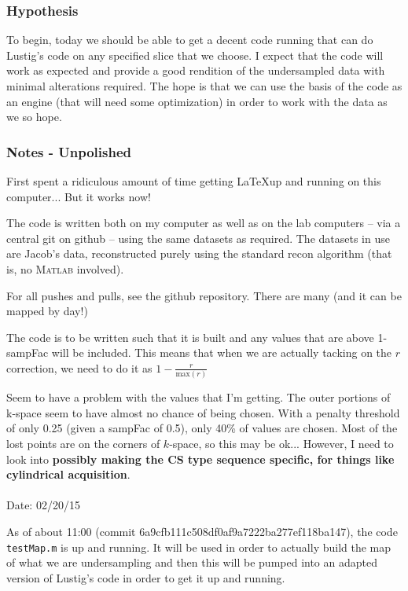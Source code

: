 \documentclass[11 pt]{article}
\newcommand{\matlab}{\textsc{Matlab }}
\begin{document}
\subsubsection{Hypothesis}
To begin, today we should be able to get a decent code running that can do Lustig's code on any specified slice that we choose. I expect that the code will work as expected and provide a good rendition of the undersampled data with minimal alterations required. The hope is that we can use the basis of the code as an engine (that will need some optimization) in order to work with the data as we so hope.


    \subsubsection{Notes - Unpolished}
    First spent a ridiculous amount of time getting \LaTeX up and running on this computer... But it works now! 

    The code is written both on my computer as well as on the lab computers -- via a central git on github -- using the same datasets as required. The datasets in use are Jacob's data, reconstructed purely using the standard recon algorithm (that is, no \matlab involved).

    For all pushes and pulls, see the github repository. There are many (and it can be mapped by day!)

    The code is to be written such that it is built and any values that are above 1-sampFac will be included. This means that when we are actually tacking on the $r$ correction, we need to do it as $1-\frac{r}{\text{max}(r)}$

    Seem to have a problem with the values that I'm getting. The outer portions of k-space seem to have almost no chance of being chosen. With a penalty threshold of only 0.25 (given a sampFac of 0.5), only 40\% of values are chosen. Most of the lost points are on the corners of $k$-space, so this may be ok... However, I need to look into \textbf{possibly making the CS type sequence specific, for things like cylindrical acquisition}. \\ \\ 

  \noindent Date: 02/20/15

    As of about 11:00 (commit 6a9cfb111c508df0af9a7222ba277ef118ba147), the code \verb!testMap.m! is up and running. It will be used in order to actually build the map of what we are undersampling and then this will be pumped into an adapted version of Lustig's code in order to get it up and running.
\end{document}
